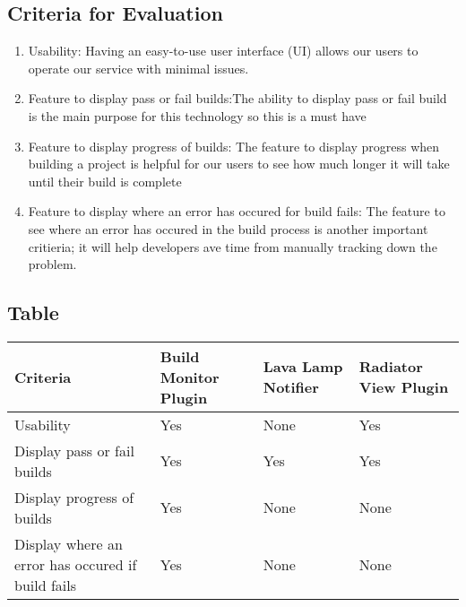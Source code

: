 \documentclass[10pt,letterpaper,onecolumn,journal]{IEEEtran}
\begin{document}
\subsection{Criteria for Evaluation}
\begin{enumerate}
  \item Usability: Having an easy-to-use user interface (UI) allows our users to operate our service with minimal issues.
  \item Feature to display pass or fail builds:The ability to display pass or fail build is  the main purpose for this technology so this is a must have
  \item Feature to display progress of builds: The feature to display progress when building a project is helpful for our users to see how much longer it will take until their build is complete
  \item Feature to display where an error has occured for build fails: The feature to see where an error has occured in the build process is another important critieria; it will help developers ave time from manually tracking down the problem.
\end{enumerate}
\subsection{Table}
\begin{center}
  \begin{tabular}{llll}
    Criteria & Build Monitor Plugin & Lava Lamp Notifier & Radiator View Plugin \\ \midrule
    Usability       & Yes & None & Yes \\ \midrule
    Display pass or fail builds           & Yes & Yes & Yes \\ \midrule
    Display progress of builds       & Yes & None & None \\ \midrule
    Display where an error has occured if build fails  & Yes & None & None \\ \bottomrule
  \end{tabular}
\end{center}
\end{document}

